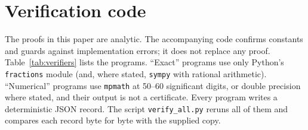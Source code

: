 \section{Verification code}\label{app:verification}

The proofs in this paper are analytic. The accompanying code confirms constants and guards against implementation errors; it does not replace any proof. Table~\ref{tab:verifiers} lists the programs. ``Exact'' programs use only Python's \texttt{fractions} module (and, where stated, \texttt{sympy} with rational arithmetic). ``Numerical'' programs use \texttt{mpmath} at 50--60 significant digits, or double precision where stated, and their output is not a certificate. Every program writes a deterministic JSON record. The script \texttt{verify\_all.py} reruns all of them and compares each record byte for byte with the supplied copy.

